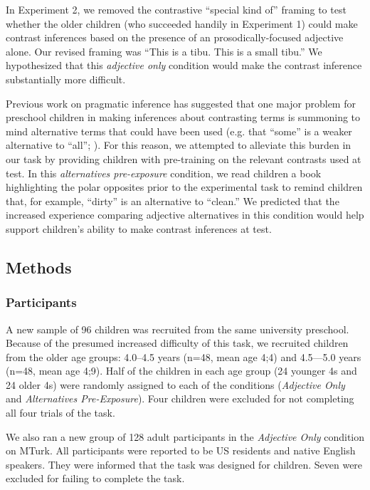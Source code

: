 \documentclass[man]{apa2}
\begin{document}

In Experiment 2, we removed the contrastive ``special kind of'' framing to test whether the older children (who succeeded handily in Experiment 1) could make contrast inferences based on the presence of an prosodically-focused adjective alone. Our revised framing was ``This is a tibu. This is a small tibu.'' We hypothesized that this \emph{adjective only} condition would make the contrast inference substantially more difficult. 

Previous work on pragmatic inference has suggested that one major problem for preschool children in making inferences about contrasting terms is summoning to mind alternative terms that could have been used (e.g. that ``some'' is a weaker alternative to ``all''; ). For this reason, we attempted to alleviate this burden in our task by providing children with pre-training on the relevant contrasts used at test. In this \emph{alternatives pre-exposure} condition, we read children a book highlighting the polar opposites prior to the experimental task to remind children that, for example, ``dirty'' is an alternative to ``clean.'' We predicted that the increased experience comparing adjective alternatives in this condition would help support children's ability to make contrast inferences at test.


\subsection{Methods}

\subsubsection{Participants}

A new sample of 96 children was recruited from the same university preschool.  Because of the presumed increased difficulty of this task, we recruited children from the older age groups: 4.0--4.5 years (n=48, mean age 4;4) and 4.5---5.0 years (n=48, mean age 4;9).  Half of the children in each age group (24 younger 4s and 24 older 4s) were randomly assigned to each of the conditions (\emph{Adjective Only} and \emph{Alternatives Pre-Exposure}). Four children were excluded for not completing all four trials of the task. 

We also ran a new group of 128 adult participants in the \emph{Adjective Only} condition on MTurk.  All participants were reported to be US residents and native English speakers.  They were informed that the task was designed for children.  Seven were excluded for failing to complete the task. 
\end{document}

